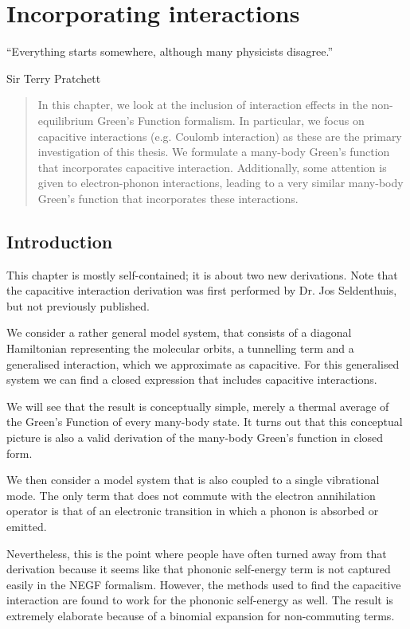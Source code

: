 \chapter{Incorporating interactions}
\label{ch:chapter_3}

\epigraph{
    “Everything starts somewhere, although many physicists disagree.”
}{Sir Terry Pratchett}

\begin{abstract}
In this chapter, we look at the inclusion of interaction effects in the non-equilibrium Green's Function formalism. In particular, we focus on capacitive interactions (e.g. Coulomb interaction) as these are the primary investigation of this thesis. We formulate a many-body Green's function that incorporates capacitive interaction. Additionally, some attention is given to electron-phonon interactions, leading to a very similar many-body Green's function that incorporates these interactions.
\end{abstract}

\newpage
\section{Introduction}
This chapter is mostly self-contained; it is about two new derivations. Note that the capacitive interaction derivation was first performed by Dr. Jos Seldenthuis, but not previously published.

We consider a rather general model system, that consists of a diagonal Hamiltonian representing the molecular orbits, a tunnelling term and a generalised interaction, which we approximate as capacitive. For this generalised system we can find a closed expression that includes capacitive interactions.

We will see that the result is conceptually simple, merely a thermal average of the Green's Function of every many-body state. It turns out that this conceptual picture is also a valid derivation of the many-body Green's function in closed form.

We then consider a model system that is also coupled to a single vibrational mode. The only term that does not commute with the electron annihilation operator is that of an electronic transition in which a phonon is absorbed or emitted. 

Nevertheless, this is the point where people have often turned away from that derivation because it seems like that phononic self-energy term is not captured easily in the NEGF formalism. However, the methods used to find the capacitive interaction are found to work for the phononic self-energy as well. The result is extremely elaborate because of a binomial expansion for non-commuting terms. 

